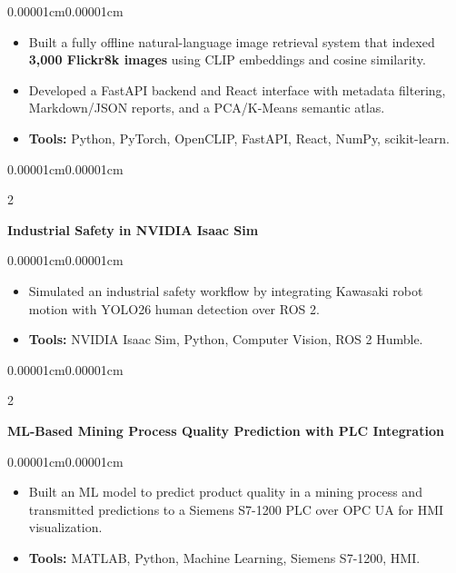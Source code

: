 \documentclass[10pt, a4paper]{article}
\newenvironment{highlights}{
    \begin{itemize}[
        topsep=0.10cm,
        parsep=0.06cm,
        partopsep=0pt,
        itemsep=0pt,
        leftmargin=10pt
    ]
}{
    \end{itemize}
}
\newenvironment{onecolentry}{
    \begin{adjustwidth}{0.00001cm}{0.00001cm}
}{
    \end{adjustwidth}
}
\newenvironment{twocolentry}[2][]{
    \onecolentry
    \def\secondColumn{#2}
    \setcolumnwidth{\fill, 4.5cm}
    \begin{paracol}{2}
}{
    \switchcolumn
    \raggedleft
    \secondColumn
    \end{paracol}
    \endonecolentry
}
\begin{document}
        \begin{onecolentry}
            \begin{highlights}
                \item Built a fully offline natural-language image retrieval system that indexed \textbf{3,000 Flickr8k images} using CLIP embeddings and cosine similarity.
                \item Developed a FastAPI backend and React interface with metadata filtering, Markdown/JSON reports, and a PCA/K-Means semantic atlas.
                \item \textbf{Tools:} Python, PyTorch, OpenCLIP, FastAPI, React, NumPy, scikit-learn.
            \end{highlights}
        \end{onecolentry}
        \vspace{0.2cm}

        \begin{twocolentry}{}
            \textbf{Industrial Safety in NVIDIA Isaac Sim}
        \end{twocolentry}
        \vspace{0.10cm}

        \begin{onecolentry}
            \begin{highlights}
                \item Simulated an industrial safety workflow by integrating Kawasaki robot motion with YOLO26 human detection over ROS 2.
                \item \textbf{Tools:} NVIDIA Isaac Sim, Python, Computer Vision, ROS 2 Humble.
            \end{highlights}
        \end{onecolentry}
        \vspace{0.2cm}

        \begin{twocolentry}{}
            \textbf{ML-Based Mining Process Quality Prediction with PLC Integration}
        \end{twocolentry}
        \vspace{0.10cm}

        \begin{onecolentry}
            \begin{highlights}
                \item Built an ML model to predict product quality in a mining process and transmitted predictions to a Siemens S7-1200 PLC over OPC UA for HMI visualization.
                \item \textbf{Tools:} MATLAB, Python, Machine Learning, Siemens S7-1200, HMI.
            \end{highlights}
        \end{onecolentry}
        \vspace{0.2cm}
\end{document}
